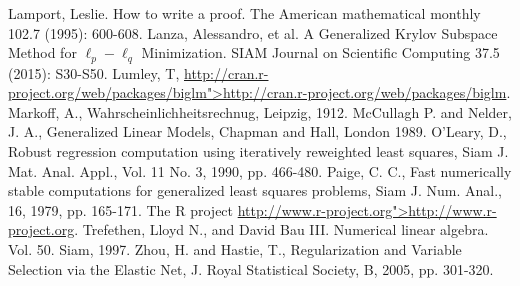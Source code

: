 \documentclass[10pt]{article} %
\begin{document}
\begin{thebibliography}{99}
 Lamport, Leslie. How to write a proof. The American mathematical monthly 102.7 (1995): 600-608.
Lanza, Alessandro, et al. A Generalized Krylov Subspace Method for $\ell_p-\ell_q$ Minimization. SIAM Journal on Scientific Computing 37.5 (2015): S30-S50.
 Lumley, T, \url{http://cran.r-project.org/web/packages/biglm">http://cran.r-project.org/web/packages/biglm}.
 Markoff, A., Wahrscheinlichheitsrechnug,  Leipzig, 1912.
 McCullagh P. and Nelder, J. A., Generalized Linear Models, Chapman and Hall, London 1989.
 O'Leary, D., Robust regression computation using iteratively reweighted least squares, Siam J. Mat. Anal. Appl., Vol. 11 No. 3, 1990, pp. 466-480.
 Paige, C. C., Fast numerically stable computations for generalized least squares problems, Siam J. Num. Anal., 16, 1979, pp. 165-171.
 The R project \url{http://www.r-project.org">http://www.r-project.org}.
 Trefethen, Lloyd N., and David Bau III. Numerical linear algebra. Vol. 50. Siam, 1997.
 Zhou, H. and Hastie, T., Regularization and Variable Selection via the Elastic Net, J. Royal Statistical Society, B, 2005, pp. 301-320.
\end{thebibliography}
\end{document}
